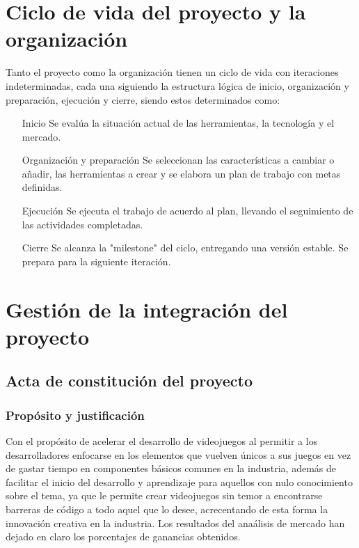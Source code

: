\documentclass[]{article}
\begin{document}
\section{Ciclo de vida del proyecto y la organizaci\'on}

Tanto el proyecto como la organizaci\'on tienen un ciclo de vida con iteraciones indeterminadas, cada una siguiendo la estructura l\'ogica de inicio, organizaci\'on y preparaci\'on, ejecuci\'on y cierre, siendo estos determinados como:
\begin{itemize}
	\item[Inicio] Se eval\'ua la situaci\'on actual de las herramientas, la tecnolog\'ia y el mercado. 
	\item[Organizaci\'on y preparaci\'on] Se seleccionan las caracter\'isticas a cambiar o añadir, las herramientas a crear y se elabora un plan de trabajo con metas definidas. 
	\item[Ejecuci\'on] Se ejecuta el trabajo de acuerdo al plan, llevando el seguimiento de las actividades completadas. 
	\item[Cierre] Se alcanza la "milestone" del ciclo, entregando una versi\'on estable. Se prepara para la siguiente iteraci\'on. 
\end{itemize}

\section{Gesti\'on de la integraci\'on del proyecto}
\subsection{Acta de constituci\'on del proyecto}
\subsubsection{Prop\'osito y justificaci\'on}
Con el prop\'osito de acelerar el desarrollo de videojuegos al permitir a los desarrolladores enfocarse en los elementos que vuelven \'unicos a sus
juegos en vez de gastar tiempo en componentes b\'asicos comunes en la industria, adem\'as de facilitar el inicio del desarrollo y aprendizaje para aquellos con nulo conocimiento sobre el tema, ya que le permite crear videojuegos sin temor a encontrarse barreras de c\'odigo a todo aquel que lo desee, acrecentando de esta forma la innovaci\'on creativa en la industria.
Los resultados del ana\'alisis de mercado han dejado en claro los porcentajes de ganancias obtenidos. 
\end{document}
